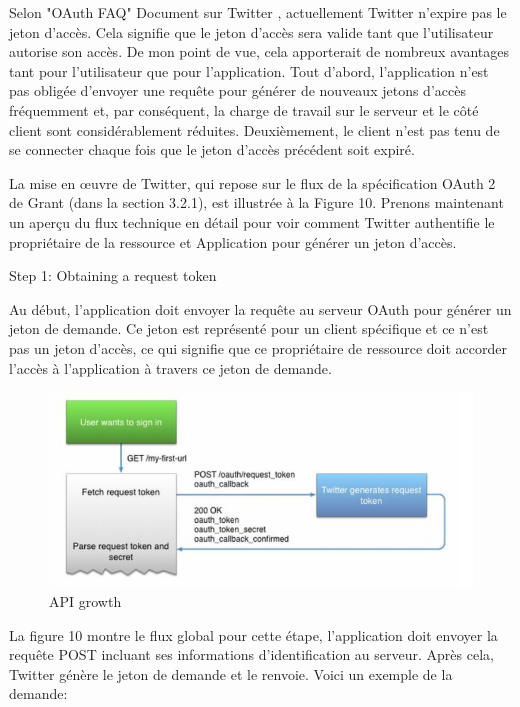 Selon "OAuth FAQ" Document sur Twitter \cite{3}, actuellement Twitter n'expire pas le jeton d'accès. Cela signifie que le jeton d'accès sera valide tant que l'utilisateur autorise son accès. De mon point de vue, cela apporterait de nombreux avantages tant pour l'utilisateur que pour l'application. Tout d'abord, l'application n'est pas obligée d'envoyer une requête pour générer de nouveaux jetons d'accès fréquemment et, par conséquent, la charge de travail sur le serveur et le côté client sont considérablement réduites. Deuxièmement, le client n'est pas tenu de se connecter chaque fois que le jeton d'accès précédent soit expiré.

La mise en œuvre de Twitter, qui repose sur le flux de la spécification OAuth 2 de Grant (dans la section 3.2.1), est illustrée à la Figure 10. Prenons maintenant un aperçu du flux technique en détail pour voir comment Twitter authentifie le propriétaire de la ressource et Application pour générer un jeton d'accès.

Step 1: Obtaining a request token 

Au début, l'application doit envoyer la requête au serveur OAuth pour générer un jeton de demande. Ce jeton est représenté pour un client spécifique et ce n'est pas un jeton d'accès, ce qui signifie que ce propriétaire de ressource doit accorder l'accès à l'application à travers ce jeton de demande.
\begin{figure}[! ht ]
			\centering
			\includegraphics[scale=.4]{./images/twitter_token_generation.png}
			\caption {API growth}
		\end{figure}
		
La figure 10 montre le flux global pour cette étape, l'application doit envoyer la requête POST incluant ses informations d'identification au serveur. Après cela, Twitter génère le jeton de demande et le renvoie. Voici un exemple de la demande:


